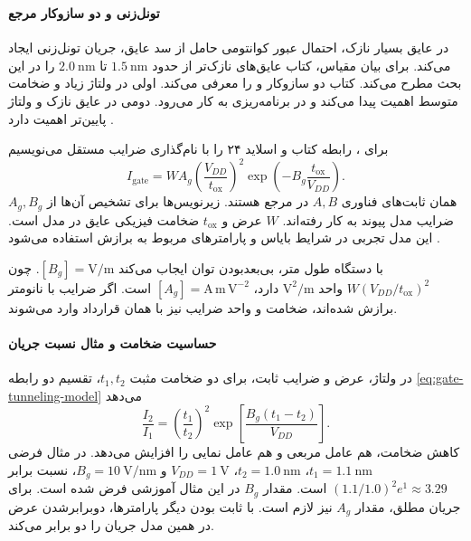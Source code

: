 \subsubsection{}
\label{sec:gate-leakage}
\paragraph*{تونل‌زنی و دو سازوکار مرجع}
در عایق بسیار نازک، احتمال عبور کوانتومی حامل از سد عایق، جریان
تونل‌زنی ایجاد می‌کند. برای بیان مقیاس، کتاب عایق‌های نازک‌تر از حدود
\(\qty{1.5}{\nano\metre}\) تا \(\qty{2.0}{\nano\metre}\) را در این
بحث مطرح می‌کند. کتاب دو سازوکار  و  را معرفی می‌کند.
اولی در ولتاژ زیاد و ضخامت متوسط اهمیت پیدا می‌کند و در برنامه‌ریزی
 به کار می‌رود. دومی در عایق نازک و ولتاژ پایین‌تر اهمیت
دارد \cite[بخش ]{weste}.

برای ، رابطه  کتاب و اسلاید ۲۴ را
با نام‌گذاری ضرایب مستقل می‌نویسیم
\begin{equation}
 I_{\mathrm{gate}}=WA_g
 \left(\frac{V_{DD}}{t_{\mathrm{ox}}}\right)^2
 \exp\!\left(-B_g\frac{t_{\mathrm{ox}}}{V_{DD}}\right).
 \label{eq:gate-tunneling-model}
\end{equation}
\(A_g,B_g\) همان ثابت‌های فناوری \(A,B\) در مرجع هستند.
زیرنویس‌ها برای تشخیص آن‌ها از ضرایب مدل پیوند به کار رفته‌اند.
\(W\) عرض و \(t_{\mathrm{ox}}\) ضخامت فیزیکی عایق در مدل است.
این مدل تجربی در شرایط بایاس و پارامترهای مربوط به برازش استفاده
می‌شود \cite[صفحه ۸۳]{weste}\cite[اسلاید ۲۴]{nonideal}.

با دستگاه طول متر، بی‌بعدبودن توان ایجاب می‌کند
\([B_g]=\unit{\volt\per\metre}\). چون
\(W(V_{DD}/t_{\mathrm{ox}})^2\) واحد
\(\mathrm{V}^2/\mathrm{m}\) دارد،
\([A_g]=\mathrm{A\,m\,V^{-2}}\) است. اگر ضرایب با نانومتر برازش
شده‌اند، ضخامت و واحد ضرایب نیز با همان قرارداد وارد می‌شوند.

\paragraph*{حساسیت ضخامت و مثال نسبت جریان}
در ولتاژ، عرض و ضرایب ثابت، برای دو ضخامت مثبت \(t_1,t_2\)، تقسیم
دو رابطه \eqref{eq:gate-tunneling-model} می‌دهد
\begin{equation}
 \frac{I_2}{I_1}=\left(\frac{t_1}{t_2}\right)^2
 \exp\!\left[\frac{B_g(t_1-t_2)}{V_{DD}}\right].
 \label{eq:gate-thickness-ratio}
\end{equation}
کاهش ضخامت، هم عامل مربعی و هم عامل نمایی را افزایش می‌دهد.
در مثال فرضی \(t_1=\qty{1.1}{\nano\metre}\)،
\(t_2=\qty{1.0}{\nano\metre}\)، \(V_{DD}=\qty{1}{\volt}\) و
\(B_g=\qty{10}{\volt\per\nano\metre}\)، نسبت برابر
\((1.1/1.0)^2e^1\approx3.29\) است. مقدار \(B_g\) در این مثال
آموزشی فرض شده است. برای جریان مطلق، مقدار \(A_g\) نیز لازم است.
با ثابت بودن دیگر پارامترها، دوبرابرشدن عرض در همین مدل جریان را
دو برابر می‌کند.

